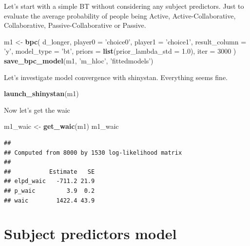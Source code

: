 \documentclass[
]{book}
\newenvironment{Shaded}{\begin{snugshade}}{\end{snugshade}}
\newcommand{\DataTypeTok}[1]{\textcolor[rgb]{0.13,0.29,0.53}{#1}}
\newcommand{\DecValTok}[1]{\textcolor[rgb]{0.00,0.00,0.81}{#1}}
\newcommand{\FloatTok}[1]{\textcolor[rgb]{0.00,0.00,0.81}{#1}}
\newcommand{\KeywordTok}[1]{\textcolor[rgb]{0.13,0.29,0.53}{\textbf{#1}}}
\newcommand{\NormalTok}[1]{#1}
\newcommand{\StringTok}[1]{\textcolor[rgb]{0.31,0.60,0.02}{#1}}
\begin{document}
Let's start with a simple BT without considering any subject predictors. Just to evaluate the average probability of people being Active, Active-Collaborative, Collaborative, Passive-Collaborative or Passive.

\begin{Shaded}
\begin{Highlighting}[]
\NormalTok{m1 <-}
\StringTok{  }\KeywordTok{bpc}\NormalTok{(}
\NormalTok{    d_longer,}
    \DataTypeTok{player0 =} \StringTok{'choice0'}\NormalTok{,}
    \DataTypeTok{player1 =} \StringTok{'choice1'}\NormalTok{,}
    \DataTypeTok{result_column =} \StringTok{'y'}\NormalTok{,}
    \DataTypeTok{model_type =} \StringTok{'bt'}\NormalTok{,}
    \DataTypeTok{priors =} \KeywordTok{list}\NormalTok{(}\DataTypeTok{prior_lambda_std =} \FloatTok{1.0}\NormalTok{),}
    \DataTypeTok{iter =} \DecValTok{3000}
\NormalTok{  )}
\KeywordTok{save_bpc_model}\NormalTok{(m1, }\StringTok{'m_hloc'}\NormalTok{, }\StringTok{'fittedmodels'}\NormalTok{)}
\end{Highlighting}
\end{Shaded}

Let's investigate model convergence with shinystan. Everything seems fine.

\begin{Shaded}
\begin{Highlighting}[]
\KeywordTok{launch_shinystan}\NormalTok{(m1)}
\end{Highlighting}
\end{Shaded}

Now let's get the waic

\begin{Shaded}
\begin{Highlighting}[]
\NormalTok{m1_waic <-}\StringTok{ }\KeywordTok{get_waic}\NormalTok{(m1)}
\NormalTok{m1_waic}
\end{Highlighting}
\end{Shaded}

\begin{verbatim}
## 
## Computed from 8000 by 1530 log-likelihood matrix
## 
##           Estimate   SE
## elpd_waic   -711.2 21.9
## p_waic         3.9  0.2
## waic        1422.4 43.9
\end{verbatim}

\hypertarget{subject-predictors-model}{%
\section{Subject predictors model}\label{subject-predictors-model}}
\end{document}
